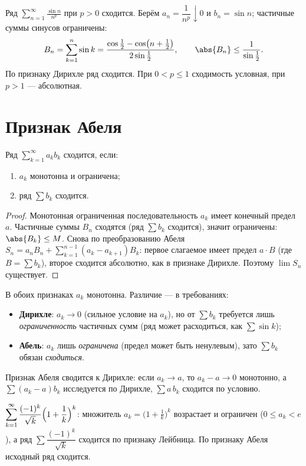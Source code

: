 \begin{example}
Ряд $\displaystyle\sum_{n=1}^\infty\frac{\sin n}{n^p}$ при $p>0$ сходится. Берём
$a_n=\dfrac1{n^p}\downarrow0$ и $b_n=\sin n$; частичные суммы синусов ограничены:
\[
  B_n=\sum_{k=1}^n\sin k=\frac{\cos\frac12-\cos\bigl(n+\frac12\bigr)}{2\sin\frac12},\qquad
  \abs{B_n}\le\frac{1}{\sin\frac12}.
\]
По признаку Дирихле ряд сходится. При $0<p\le1$ сходимость условная, при $p>1$ — абсолютная.
\end{example}

\section{Признак Абеля}

\begin{theorem}[Абель]
Ряд $\displaystyle\sum_{k=1}^\infty a_k b_k$ сходится, если:
\begin{enumerate}[label=\arabic*),leftmargin=*]
  \item $a_k$ монотонна и ограничена;
  \item ряд $\sum b_k$ сходится.
\end{enumerate}
\end{theorem}

\begin{proof}
Монотонная ограниченная последовательность $a_k$ имеет конечный предел $a$. Частичные суммы $B_n$
сходятся (ряд $\sum b_k$ сходится), значит ограничены: $\abs{B_k}\le M$. Снова по преобразованию
Абеля $S_n=a_n B_n+\sum_{k=1}^{n-1}(a_k-a_{k+1})B_k$: первое слагаемое имеет предел $a\cdot B$
(где $B=\sum b_k$), второе сходится абсолютно, как в признаке Дирихле. Поэтому $\lim S_n$
существует.
\end{proof}

\begin{remark}
В обоих признаках $a_k$ монотонна. Различие — в требованиях:
\begin{itemize}[leftmargin=*]
  \item \textbf{Дирихле}: $a_k\to0$ (сильное условие на $a_k$), но от $\sum b_k$ требуется лишь
        \emph{ограниченность} частичных сумм (ряд может расходиться, как $\sum\sin k$);
  \item \textbf{Абель}: $a_k$ лишь \emph{ограничена} (предел может быть ненулевым), зато $\sum b_k$
        обязан \emph{сходиться}.
\end{itemize}
Признак Абеля сводится к Дирихле: если $a_k\to a$, то $a_k-a\to0$ монотонно, а
$\sum(a_k-a)b_k$ исследуется по Дирихле, $\sum a\,b_k$ сходится по условию.
\end{remark}

\begin{example}
$\displaystyle\sum_{k=1}^\infty\frac{(-1)^k}{\sqrt k}\Bigl(1+\frac1k\Bigr)^k$: множитель
$a_k=\bigl(1+\tfrac1k\bigr)^k$ возрастает и ограничен ($0\le a_k<e$), а ряд
$\sum\dfrac{(-1)^k}{\sqrt k}$ сходится по признаку Лейбница. По признаку Абеля исходный ряд
сходится.
\end{example}
